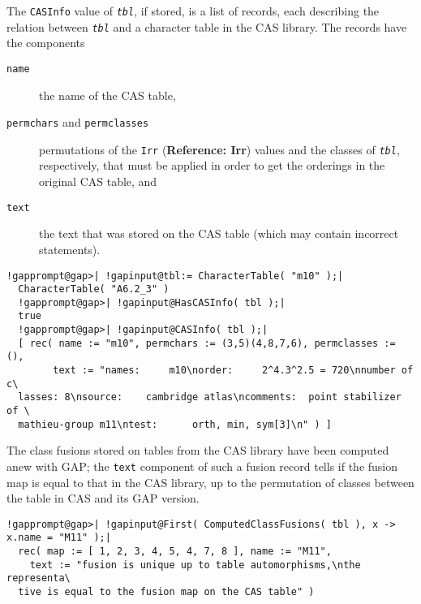 \documentclass[a4paper,11pt]{report}
\begin{document}
{{{ The \texttt{CASInfo} value of \mbox{\texttt{\mdseries\slshape tbl}}, if stored, is a list of records, each describing the relation between \mbox{\texttt{\mdseries\slshape tbl}} and a character table in the \textsf{CAS} library. The records have the components 
\begin{description}
\item[{\texttt{name}}]  the name of the \textsf{CAS} table, 
\item[{\texttt{permchars} and \texttt{permclasses}}]  permutations of the \texttt{Irr} (\textbf{Reference: Irr}) values and the classes of \mbox{\texttt{\mdseries\slshape tbl}}, respectively, that must be applied in order to get the orderings in the
original \textsf{CAS} table, and 
\item[{\texttt{text}}]  the text that was stored on the \textsf{CAS} table (which may contain incorrect statements). 
\end{description}
 
\begin{Verbatim}[commandchars=!@|,fontsize=\small,frame=single,label=Example]
  !gapprompt@gap>| !gapinput@tbl:= CharacterTable( "m10" );|
  CharacterTable( "A6.2_3" )
  !gapprompt@gap>| !gapinput@HasCASInfo( tbl );|
  true
  !gapprompt@gap>| !gapinput@CASInfo( tbl );|
  [ rec( name := "m10", permchars := (3,5)(4,8,7,6), permclasses := (), 
        text := "names:     m10\norder:     2^4.3^2.5 = 720\nnumber of c\
  lasses: 8\nsource:    cambridge atlas\ncomments:  point stabilizer of \
  mathieu-group m11\ntest:      orth, min, sym[3]\n" ) ]
\end{Verbatim}
 

 The class fusions stored on tables from the \textsf{CAS} library have been computed anew with \textsf{GAP}; the \texttt{text} component of such a fusion record tells if the fusion map is equal to that in
the \textsf{CAS} library, up to the permutation of classes between the table in \textsf{CAS} and its \textsf{GAP} version. 

 
\begin{Verbatim}[commandchars=!@|,fontsize=\small,frame=single,label=Example]
  !gapprompt@gap>| !gapinput@First( ComputedClassFusions( tbl ), x -> x.name = "M11" );|
  rec( map := [ 1, 2, 3, 4, 5, 4, 7, 8 ], name := "M11", 
    text := "fusion is unique up to table automorphisms,\nthe representa\
  tive is equal to the fusion map on the CAS table" )
\end{Verbatim}
 }

 }

  
}
\end{document}
